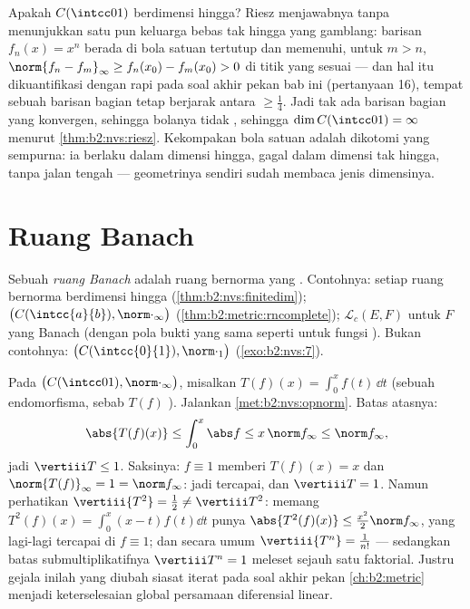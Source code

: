 \begin{example}\label{ex:b2:nvs:rieszdetector}
Apakah $C(\intcc01)$ berdimensi hingga? Riesz menjawabnya tanpa
menunjukkan satu pun keluarga bebas tak hingga yang gamblang: barisan
$f_n(x) = x^n$ berada di bola satuan tertutup dan memenuhi, untuk
$m > n$, $\norm{f_n - f_m}_\infty \geq f_n(x_0) - f_m(x_0) > 0$
di titik yang sesuai --- dan hal itu dikuantifikasi dengan rapi pada soal
akhir pekan bab ini (pertanyaan 16), tempat sebuah barisan bagian tetap
berjarak antara $\geq \frac14$. Jadi tak ada barisan bagian yang
konvergen, sehingga bolanya tidak , sehingga $\dim C(\intcc01) =
\infty$ menurut \cref{thm:b2:nvs:riesz}. Kekompakan bola satuan adalah
dikotomi yang sempurna: ia berlaku dalam dimensi hingga, gagal dalam
dimensi tak hingga, tanpa jalan tengah --- geometrinya sendiri sudah
membaca jenis dimensinya.
\end{example}

\section{Ruang Banach}

\begin{definition}\label{def:b2:nvs:banach}
Sebuah \emph{ruang Banach} adalah ruang bernorma
yang . Contohnya: setiap ruang bernorma berdimensi hingga
(\cref{thm:b2:nvs:finitedim}); $\bigl(C(\intcc{a}{b}),
\norm\cdot_\infty\bigr)$ (\cref{thm:b2:metric:rncomplete});
$\mathcal{L}_c(E, F)$ untuk $F$ yang Banach (dengan pola bukti yang sama
seperti untuk fungsi ). Bukan contohnya: $\bigl(C(\intcc{0}{1}),
\norm\cdot_1\bigr)$ (\cref{exo:b2:nvs:7}).
\end{definition}

\begin{example}\label{ex:b2:nvs:integrationnorm}
Pada $\bigl(C(\intcc01), \norm\cdot_\infty\bigr)$, misalkan $T(f)(x) =
\int_0^x f(t)\,\dd t$ (sebuah endomorfisma, sebab $T(f)$ ).
Jalankan \cref{met:b2:nvs:opnorm}. Batas atasnya:
\[
\abs{T(f)(x)} \leq \int_0^x\abs f \leq x\,\norm f_\infty \leq
\norm f_\infty ,
\]
jadi $\vertiii T \leq 1$. Saksinya: $f \equiv 1$ memberi $T(f)(x) =
x$ dan $\norm{T(f)}_\infty = 1 = \norm f_\infty$: jadi tercapai, dan
$\vertiii T = 1$. Namun perhatikan $\vertiii{T^2} = \frac12 \neq
\vertiii T^2$: memang $T^2(f)(x) = \int_0^x(x - t)f(t)\dd t$ punya
$\abs{T^2(f)(x)} \leq \frac{x^2}2\norm f_\infty$, yang lagi-lagi tercapai
di $f \equiv 1$; dan secara umum $\vertiii{T^n} = \frac1{n!}$ ---
sedangkan batas submultiplikatifnya $\vertiii T^n = 1$ meleset sejauh
satu faktorial. Justru gejala inilah yang diubah siasat iterat pada
soal akhir pekan \cref{ch:b2:metric} menjadi keterselesaian global
persamaan diferensial linear.
\end{example}

